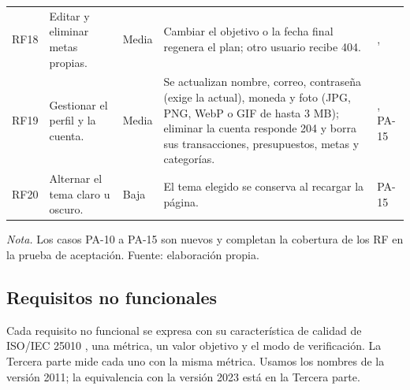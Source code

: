 {\begin{longtable}{L{1cm} L{4.2cm} L{1.1cm} L{5cm} L{2.6cm}}
RF18 & Editar y eliminar metas propias. & Media & Cambiar el objetivo o la fecha final regenera el plan; otro usuario recibe 404. & ,  \\
RF19 & Gestionar el perfil y la cuenta. & Media & Se actualizan nombre, correo, contraseña (exige la actual), moneda y foto (JPG, PNG, WebP o GIF de hasta 3 MB); eliminar la cuenta responde 204 y borra sus transacciones, presupuestos, metas y categorías. & , PA-15 \\
RF20 & Alternar el tema claro u oscuro. & Baja & El tema elegido se conserva al recargar la página. & PA-15 \\
\end{longtable}
}
\vspace{-1em}
{\small\textit{Nota.} Los casos PA-10 a PA-15 son nuevos y completan la cobertura de los RF en la prueba de aceptación. Fuente: elaboración propia.}

\subsection{Requisitos no funcionales}

Cada requisito no funcional se expresa con su característica de calidad de ISO/IEC 25010 \parencite{iso25010}, una métrica, un valor objetivo y el modo de verificación. La Tercera parte mide cada uno con la misma métrica. Usamos los nombres de la versión 2011; la equivalencia con la versión 2023 está en la Tercera parte.

